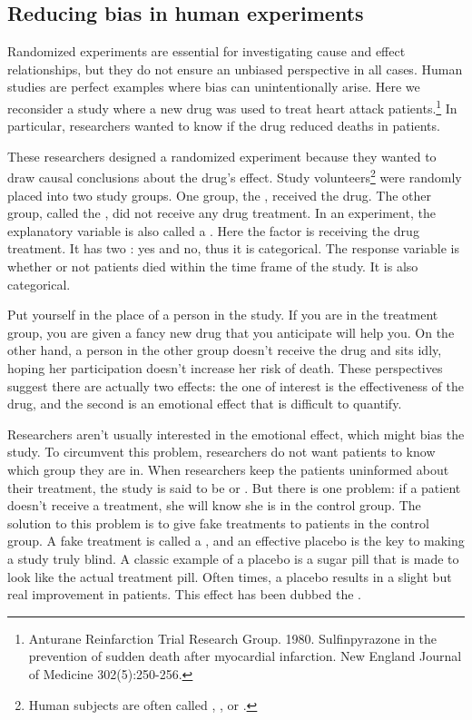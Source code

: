 \subsection{Reducing bias in human experiments}
\label{biasInHumanExperiments}


Randomized experiments are essential for investigating cause and effect relationships, but they do not ensure an unbiased perspective in all cases. Human studies are perfect examples where bias can unintentionally arise. Here we reconsider a study where a new drug was used to treat heart attack patients.\footnote{Anturane Reinfarction Trial Research Group. 1980. Sulfinpyrazone in the prevention of sudden death after myocardial infarction. New England Journal of Medicine 302(5):250-256.} In particular, researchers wanted to know if the drug reduced deaths in patients.

These researchers designed a randomized experiment because they wanted to draw causal conclusions about the drug's effect. Study volunteers\footnote{Human subjects are often called , , or .} were randomly placed into two study groups. One group, the , received the drug. The other group, called the , did not receive any drug treatment. In an experiment, the explanatory variable is also called a . Here the factor is receiving the drug treatment. It has two : yes and no, thus it is categorical. The response variable is whether or not patients died within the time frame of the study. It is also categorical.

Put yourself in the place of a person in the study. If you are in the treatment group, you are given a fancy new drug that you anticipate will help you. On the other hand, a person in the other group doesn't receive the drug and sits idly, hoping her participation doesn't increase her risk of death. These perspectives suggest there are actually two effects: the one of interest is the effectiveness of the drug, and the second is an emotional effect that is difficult to quantify.

Researchers aren't usually interested in the emotional effect, which might bias the study. To circumvent this problem, researchers do not want patients to know which group they are in. When researchers keep the patients uninformed about their treatment, the study is said to be  or . But there is one problem: if a patient doesn't receive a treatment, she will know she is in the control group. The solution to this problem is to give fake treatments to patients in the control group. A fake treatment is called a , and an effective placebo is the key to making a study truly blind. A classic example of a placebo is a sugar pill that is made to look like the actual treatment pill. Often times, a placebo results in a slight but real improvement in patients. This effect has been dubbed the .

